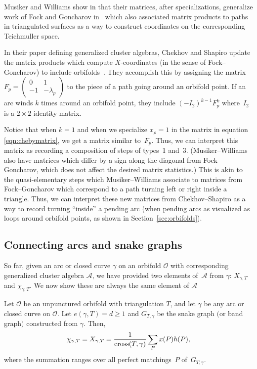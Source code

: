 \begin{Remark}Musiker and Williams show in \cite[Section~4]{MW} that their matrices, after specializations, generalize work of Fock and Goncharov in~\cite{FG3} which also associated matrix products to paths in triangulated surfaces as a way to construct coordinates on the corresponding Teichmuller space.

In their paper defining generalized cluster algebras, Chekhov and Shapiro update the matrix products which compute $X$-coordinates (in the sense of Fock--Goncharov) to include orbifolds~\cite{Chekhov-Shapiro}.
They accomplish this by assigning the matrix $F_p = \left(\begin{smallmatrix} 0 & 1 \\ -1 & -\lambda_p \end{smallmatrix}\right)$ to the piece of a path going around an orbifold point. If an arc winds $k$ times around an orbifold point, they include $(-I_2)^{k-1}F_p^k$ where~$I_2$ is a $2 \times 2$ identity matrix.

Notice that when $k = 1$ and when we specialize $x_\rho = 1$ in the matrix in equation \eqref{eqn:chebymatrix}, we get a matrix similar to~$F_p$. Thus, we can interpret this matrix as recording a composition of steps of types~1 and~3. (Musiker--Williams also have matrices which differ by a sign along the diagonal from Fock--Goncharov, which does not affect the desired matrix statistics.) This is akin to the quasi-elementary steps which Musiker--Williams associate to matrices from Fock--Goncharov which correspond to a path turning left or right inside a triangle. Thus, we can interpret these new matrices from Chekhov--Shapiro as a way to record turning ``inside'' a pending arc (when pending arcs as visualized as loops around orbifold points, as shown in Section~\ref{sec:orbifolds}).
\end{Remark}

\subsection{Connecting arcs and snake graphs}

So far, given an arc or closed curve $\gamma$ on an orbifold $\mathcal{O}$ with corresponding generalized cluster algebra $\mathcal{A}$, we have provided two elements of~$\mathcal{A}$ from $\gamma$: $X_{\gamma,T}$ and $\chi_{\gamma,T}$. We now show these are always the same element of $\mathcal{A}$

\begin{Theorem}\label{Thm:ArcsAndGraphs}
Let $\mathcal{O}$ be an unpunctured orbifold with triangulation $T$, and let $\gamma$ be any arc or closed curve on $\mathcal{O}$. Let $e(\gamma, T) = d \geq 1$ and $G_{T,\gamma}$ be the snake graph $($or band graph$)$ constructed from $\gamma$. Then,
\begin{equation}\label{MandGraphEqn}
\chi_{\gamma,T} = X_{\gamma,T} = \frac{1}{{\rm cross}(T,\gamma)} \sum_P x(P) h(P),
\end{equation}
where the summation ranges over all perfect matchings~$P$ of~$G_{T,\gamma}$.
\end{Theorem}

